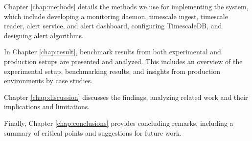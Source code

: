 Chapter \ref{chap:methods} details the methods we use for implementing the system, which include developing a monitoring daemon, timescale ingest, timescale reader, alert service, and alert dashboard, configuring TimescaleDB, and designing alert algorithms.

In Chapter \ref{chap:result}, benchmark results from both experimental and production setups are presented and analyzed. This includes an overview of the experimental setup, benchmarking results, and insights from production environments by case studies.

Chapter \ref{chap:discussion} discusses the findings, analyzing related work and their implications and limitations.

Finally, Chapter \ref{chap:conclusions} provides concluding remarks, including a summary of critical points and suggestions for future work.
